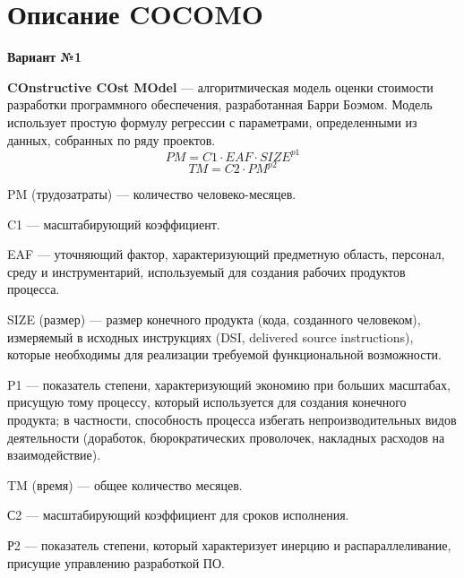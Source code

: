 \chapter{Описание COCOMO}

\textbf{Вариант №1}

\textbf{COnstructive COst MOdel} --- алгоритмическая модель оценки стоимости разработки программного обеспечения, разработанная Барри Боэмом.
Модель использует простую формулу регрессии с параметрами, определенными из данных, собранных по ряду проектов.
$$PM = C1 \cdot EAF \cdot {SIZE}^{p1}$$
$$TM = C2 \cdot {PM}^{p2}$$

PM (трудозатраты) --- количество человеко-месяцев.

C1 --- масштабирующий коэффициент.

EAF --- уточняющий фактор, характеризующий предметную область, персонал, среду и инструментарий, используемый для создания рабочих продуктов процесса.

SIZE (размер) --- размер конечного продукта (кода, созданного человеком), измеряемый в исходных инструкциях (DSI, delivered source instructions), которые необходимы для реализации требуемой функциональной возможности.

P1 --- показатель степени, характеризующий экономию при больших масштабах, присущую тому процессу, который используется для создания конечного продукта; в частности, способность процесса избегать непроизводительных видов деятельности (доработок, бюрократических проволочек,
накладных расходов на взаимодействие).

TM (время) --- общее количество месяцев.

С2 --- масштабирующий коэффициент для сроков исполнения.

Р2 --- показатель степени, который характеризует инерцию и распараллеливание, присущие управлению разработкой ПО.

